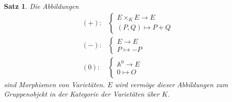 \documentclass{amsart}
\theoremstyle{plain}
\newtheorem{proposition}[subsection]{Satz}
\theoremstyle{definition}
\newcommand{\affinespace}{\mathds{A}}
\begin{document}
\begin{proposition}
	Die Abbildungen
	\begin{align*}
		(+) \colon &
		\begin{cases}
			E \times_K E \rightarrow E \\
			(P, Q) \mapsto P + Q
		\end{cases} \\
		({-}) \colon &
		\begin{cases}
			E \rightarrow E \\
			P \mapsto -P
		\end{cases} \\
		(0) \colon &
		\begin{cases}
			\affinespace^0 \rightarrow E \\
			0 \mapsto O
		\end{cases}
	\end{align*}
	sind Morphismen von Varietäten.
	$E$ wird vermöge dieser Abbildungen zum Gruppenobjekt in der Kategorie der Varietäten über $K$.
\end{proposition}
\end{document}
